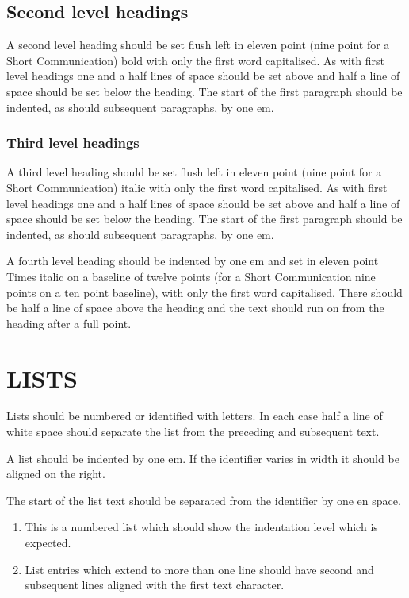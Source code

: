 \subsection*{Second level headings}

A second level heading should be set flush left in eleven
point (nine point for a Short Communication) bold with only the first word
capitalised. As with first
level headings one and a half lines of space should be set above
and half a line of space should be set below the heading. The
start of the first paragraph should be indented,
as should subsequent paragraphs, by one em.

\subsubsection*{Third level headings}

A third level heading should be set flush left in eleven
point (nine point for a Short Communication) italic with only the first word
capitalised. As with first
level headings one and a half lines of space should be set above
and half a line of space should be set below the heading. The
start of the first paragraph\cite{UFFS}
should be indented, as should subsequent paragraphs, by one em.

A fourth level heading should be indented by one em and set in eleven point
Times italic on a baseline of twelve points (for a Short Communication nine
points on a ten point baseline), with only the first word
capitalised. There should be half a
line of space above the heading and the text should run on from the heading
after a full point.

\section*{LISTS}

Lists should be numbered or
identified with letters. In each case half a line of white space
should separate the list from the preceding and subsequent text.

A list should be indented by one em. If the identifier varies in
width it should be aligned on the right.

The start of the list text should be separated from the
identifier by one en space.

\begin{enumerate}

\item
This is a numbered list which should show the
indentation level which is expected.

\item
List entries which extend to more than one line should
have second and subsequent lines aligned with the first text character.

\end{enumerate}

